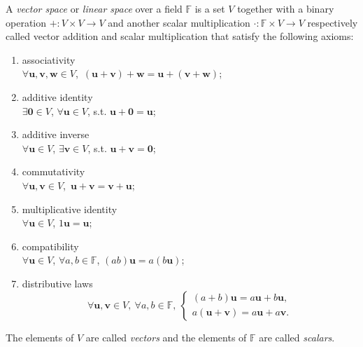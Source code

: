 \begin{defn}
  \label{def:vectorSpace}
  A \emph{vector space} or \emph{linear space}
   over a field $\mathbb{F}$ is a set $V$
   together with a binary operation
   $+:V\times V\rightarrow V$
   and another scalar multiplication
   $\cdot:\mathbb{F}\times V \rightarrow V$
   respectively called vector addition and scalar multiplication
   that satisfy the following axioms:
   \begin{enumerate}[({VSA}-1)]\itemsep0em
   \item associativity\\
     $\forall \mathbf{u},\mathbf{v}, \mathbf{w}\in V$,\ 
     $(\mathbf{u}+\mathbf{v})+\mathbf{w}
     =\mathbf{u}+(\mathbf{v}+\mathbf{w})$;
   \item additive identity\\
     $\exists \mathbf{0}\in V$,
     $\forall \mathbf{u}\in V$,
     s.t. $\mathbf{u}+\mathbf{0}=\mathbf{u}$;
   \item additive inverse\\
     $\forall \mathbf{u}\in V$,
     $\exists \mathbf{v}\in V$,
     s.t. $\mathbf{u}+\mathbf{v}=\mathbf{0}$;
   \item commutativity\\
     $\forall \mathbf{u},\mathbf{v}\in V$,\ 
     $\mathbf{u}+\mathbf{v}=\mathbf{v}+\mathbf{u}$;
   \item multiplicative identity\\
     $\forall \mathbf{u}\in V$,
     $1\mathbf{u}=\mathbf{u}$;
   \item compatibility\\
     $\forall \mathbf{u}\in V$, $\forall a,b\in \mathbb{F}$, 
     $(ab)\mathbf{u} = a(b\mathbf{u})$;
   \item distributive laws
     \begin{displaymath}
       \forall \mathbf{u},\mathbf{v}\in V,\ 
       \forall a,b\in \mathbb{F},\ 
       \left\{
       \begin{array}{l}
         (a+b)\mathbf{u}=a\mathbf{u}+b\mathbf{u}, \\
         a(\mathbf{u}+\mathbf{v})=a\mathbf{u}+a\mathbf{v}.
       \end{array}
       \right.
     \end{displaymath}
   \end{enumerate}
  The elements of $V$ are called \emph{vectors}
   and the elements of $\mathbb{F}$ are called \emph{scalars}.
\end{defn}


